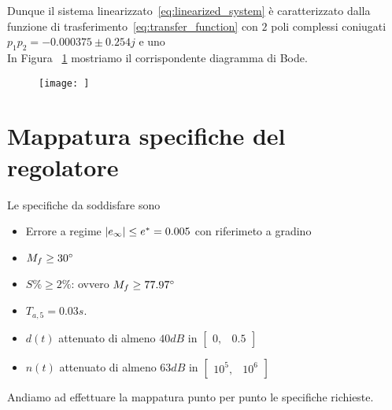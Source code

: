 \documentclass[a4paper, 11pt]{article}
\begin{document}
Dunque il sistema linearizzato~\eqref{eq:linearized_system} è caratterizzato dalla funzione di trasferimento~\eqref{eq:transfer_function} con $2$ poli complessi coniugati $p_1p_2 = -0.000375 \pm 0.254j $ e uno\\ In Figura ~\ref{Figura1} mostriamo il corrispondente diagramma di Bode. 
\begin{figure}[H]
    \centering
\texttt{[image: ]}
    \caption{}
    \label{Figura1}
\end{figure}

\section{Mappatura specifiche del regolatore}
\label{sec:specifications}

Le specifiche da soddisfare sono
\begin{itemize}
	\item[1)] Errore a regime $\space |e_{\infty}| \le e^* = 0.005 $ con riferimeto a gradino
	\\
	\item[2)] $M_f \ge 30\degree$ 
 \\
	\item[3)] $S\%\ge 2\%$: ovvero $M_f \ge 77.97\degree$
 \\
	\item[4)] $T_{a,5} = 0.03s$. 
 \\
	\item[5)]$d(t)$ attenuato di almeno $40dB$ in $\begin{bmatrix}
	    0 , & 0.5
	\end{bmatrix}$
 \\
	\item[6)]$n(t)$ attenuato di almeno $63dB$ in $\begin{bmatrix}
	    10^5 , & 10^6
	\end{bmatrix}$
\end{itemize}
%
Andiamo ad effettuare la mappatura punto per punto le specifiche richieste.
\end{document}
